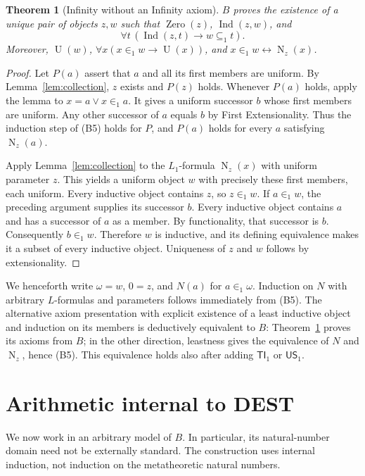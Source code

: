 \documentclass[11pt,a4paper]{article}
\numberwithin{equation}{section}
\newtheorem{theorem}{Theorem}[section]
\theoremstyle{definition}
\theoremstyle{remark}
\newcommand{\TI}{\mathsf{TI}_1}
\newcommand{\US}{\mathsf{US}_1}
\newcommand{\Unif}{\operatorname{U}}
\newcommand{\Zero}{\operatorname{Zero}}
\newcommand{\Ind}{\operatorname{Ind}}
\newcommand{\Nat}{\operatorname{N}}
\newcommand{\subone}{\subseteq_1}
\newcommand{\extone}{\in_1}
\begin{document}
\begin{theorem}[Infinity without an Infinity axiom]\label{thm:omega}
$B$ proves the existence of a unique pair of objects $z,w$ such that $\Zero(z)$, $\Ind(z,w)$, and
\[\forall t\,(\Ind(z,t)\to w\subone t).\]
Moreover, $\Unif(w)$, $\forall x(x\extone w\to\Unif(x))$, and $x\extone w\leftrightarrow\Nat_z(x)$.
\end{theorem}
\begin{proof}
Let $P(a)$ assert that $a$ and all its first members are uniform. By Lemma~\ref{lem:collection}, $z$ exists and $P(z)$ holds. Whenever $P(a)$ holds, apply the lemma to $x=a\lor x\extone a$. It gives a uniform successor $b$ whose first members are uniform. Any other successor of $a$ equals $b$ by First Extensionality. Thus the induction step of (B5) holds for $P$, and $P(a)$ holds for every $a$ satisfying $\Nat_z(a)$.

Apply Lemma~\ref{lem:collection} to the $L_1$-formula $\Nat_z(x)$ with uniform parameter $z$. This yields a uniform object $w$ with precisely these first members, each uniform. Every inductive object contains $z$, so $z\extone w$. If $a\extone w$, the preceding argument supplies its successor $b$. Every inductive object contains $a$ and has a successor of $a$ as a member. By functionality, that successor is $b$. Consequently $b\extone w$. Therefore $w$ is inductive, and its defining equivalence makes it a subset of every inductive object. Uniqueness of $z$ and $w$ follows by extensionality.
\end{proof}
We henceforth write $\omega=w$, $0=z$, and $N(a)$ for $a\extone\omega$. Induction on $N$ with arbitrary $L$-formulas and parameters follows immediately from (B5). The alternative axiom presentation with explicit existence of a least inductive object and induction on its members is deductively equivalent to $B$: Theorem~\ref{thm:omega} proves its axioms from $B$; in the other direction, leastness gives the equivalence of $N$ and $\Nat_z$, hence (B5). This equivalence holds also after adding $\TI$ or $\US$.

\section{Arithmetic internal to DEST}\label{sec:arith}
We now work in an arbitrary model of $B$. In particular, its natural-number domain need not be externally standard. The construction uses internal induction, not induction on the metatheoretic natural numbers.
\end{document}
